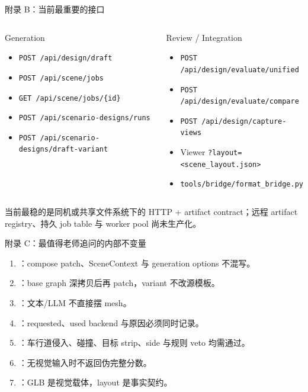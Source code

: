 \documentclass[aspectratio=169,10pt]{ctexbeamer}
\begin{document}
\begin{frame}{附录 B：当前最重要的接口}
  \begin{columns}[T,onlytextwidth]
      \begin{block}{Generation}
        \begin{itemize}
          \item \texttt{POST /api/design/draft}
          \item \texttt{POST /api/scene/jobs}
          \item \texttt{GET /api/scene/jobs/\{id\}}
          \item \texttt{POST /api/scenario-designs/runs}
          \item \texttt{POST /api/scenario-designs/draft-variant}
        \end{itemize}
      \end{block}
      \begin{exampleblock}{Review / Integration}
        \begin{itemize}
          \item \texttt{POST /api/design/evaluate/unified}
          \item \texttt{POST /api/design/evaluate/compare}
          \item \texttt{POST /api/design/capture-views}
          \item Viewer \texttt{?layout=<scene\_layout.json>}
          \item \texttt{tools/bridge/format\_bridge.py}
        \end{itemize}
      \end{exampleblock}
  \end{columns}
  \deckgap
  \begin{callout}[部署边界]
    当前最稳的是同机或共享文件系统下的 HTTP + artifact contract；远程 artifact registry、持久 job table 与 worker pool 尚未生产化。
  \end{callout}
\end{frame}

\begin{frame}{附录 C：最值得老师追问的内部不变量}
  \begin{enumerate}
    \item {}：compose patch、SceneContext 与 generation options 不混写。
    \item {}：base graph 深拷贝后再 patch，variant 不改源模板。
    \item {}：文本/LLM 不直接摆 mesh。
    \item {}：requested、used backend 与原因必须同时记录。
    \item {}：车行道侵入、碰撞、目标 strip、side 与规则 veto 均需通过。
    \item {}：无视觉输入时不返回伪完整分数。
    \item {}：GLB 是视觉载体，layout 是事实契约。
  \end{enumerate}
\end{frame}
\end{document}

